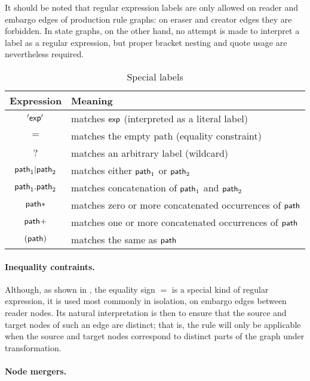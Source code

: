 It should be noted that regular expression labels are only allowed on reader
and embargo edges of production rule graphs: on eraser and creator edges they
are forbidden. In state graphs, on the other hand, no attempt is made to
interpret a label as a regular expression, but proper bracket nesting and quote
usage are nevertheless required.
%
\begin{table}
\begin{center}
\begin{tabular}{|c|l|}
\hline\hline
\bf Expression & \bf Meaning \\
\hline
$'\mathsf{exp}'$ & matches $\mathsf{exp}$ (interpreted as a literal label) \\
$=$ & matches the empty path (equality constraint) \\
$?$ & matches an arbitrary label (wildcard) \\
\hline
$\mathsf{path}_1|\mathsf{path}_2$ & matches either $\mathsf{path}_1$ or $\mathsf{path}_2$ \\
$\mathsf{path}_1.\mathsf{path}_2$ & matches concatenation of $\mathsf{path}_1$ and $\mathsf{path}_2$ \\
\hline
$\mathsf{path}{*}$ & matches zero or more concatenated occurrences of $\mathsf{path}$ \\
$\mathsf{path}{+}$ & matches one or more concatenated occurrences of $\mathsf{path}$ \\
\hline
$(\mathsf{path})$ & matches the same as $\mathsf{path}$ \\
\hline
\hline\hline
\end{tabular}
\end{center}
\caption{Special labels}
\end{table}

\paragraph{Inequality contraints.}

Although, as shown in , the equality sign $=$ is a special kind of
regular expression, it is used most commonly in isolation, on embargo edges
between reader nodes. Its natural interpretation is then to ensure that the
source and target nodes of such an edge are distinct; that is, the rule will
only be applicable when the source and target nodes correspond to distinct
parts of the graph under transformation.

\paragraph{Node mergers.}

